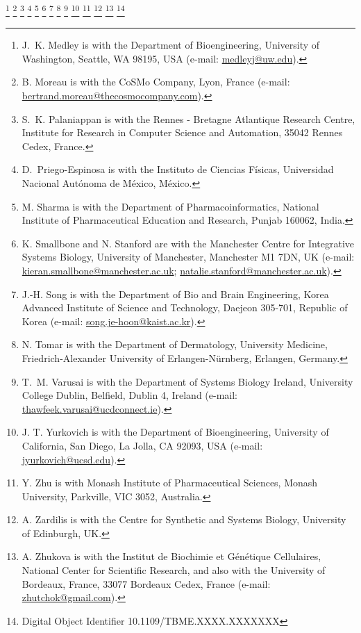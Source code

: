 \documentclass[journal,transmag]{IEEEtran}
\newcommand{\email}[1]{\href{mailto:#1}{#1}}
\begin{document}
{    \thanks{J.~K. Medley is with the Department of Bioengineering, University of Washington, Seattle, WA 98195, USA (e-mail: \email{medleyj@uw.edu}).}
    \thanks{B. Moreau is with the CoSMo Company, Lyon, France (e-mail: \email{bertrand.moreau@thecosmocompany.com}).}
    \thanks{S.~K. Palaniappan is with the Rennes - Bretagne Atlantique Research Centre, Institute for Research in Computer Science and Automation, 35042 Rennes Cedex, France.}
    \thanks{D.~Priego-Espinosa is with the Instituto de Ciencias F{\'i}sicas, Universidad Nacional Aut{\'o}noma de M{\'e}xico, M{\'e}xico.}
    \thanks{M. Sharma is with the Department of Pharmacoinformatics, National Institute of Pharmaceutical Education and Research, Punjab 160062, India.}
    \thanks{K. Smallbone and N. Stanford are with the Manchester Centre for Integrative Systems Biology, University of Manchester, Manchester M1 7DN, UK (e-mail: \email{kieran.smallbone@manchester.ac.uk};  \email{natalie.stanford@manchester.ac.uk}).}
    \thanks{J.-H. Song is with the Department of Bio and Brain Engineering, Korea Advanced Institute of Science and Technology, Daejeon 305-701, Republic of Korea (e-mail: \email{song.je-hoon@kaist.ac.kr}).}
    \thanks{N. Tomar is with the Department of Dermatology, University Medicine, Friedrich-Alexander University of Erlangen-N\"urnberg, Erlangen, Germany.}
   \thanks{T.~M. Varusai is with the Department of Systems Biology Ireland, University College Dublin, Belfield, Dublin 4, Ireland (e-mail: \email{thawfeek.varusai@ucdconnect.ie}).}
    \thanks{J. T. Yurkovich is with the Department of Bioengineering, University of California, San Diego, La Jolla, CA 92093, USA (e-mail: \email{jyurkovich@ucsd.edu}).}
    \thanks{Y. Zhu is with Monash Institute of Pharmaceutical Sciences, Monash University, Parkville, VIC 3052, Australia.}
    \thanks{A. Zardilis is with the Centre for Synthetic and Systems Biology, University of Edinburgh, UK.} 
    \thanks{A. Zhukova is with the Institut de Biochimie et G\'en\'etique Cellulaires, National Center for Scientific Research, and also with the University of Bordeaux, France, 33077 Bordeaux Cedex, France (e-mail: \email{zhutchok@gmail.com}).}
    \thanks{Digital Object Identifier 10.1109/TBME.XXXX.XXXXXXX}
}

\maketitle
\end{document}
